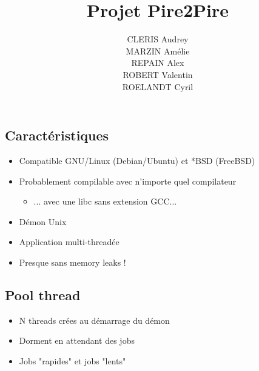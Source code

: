 \documentclass{beamer}
\begin{document}
\title{Projet Pire2Pire}
\author {
CLERIS Audrey        \\
MARZIN Amélie        \\
REPAIN Alex          \\
ROBERT Valentin      \\
ROELANDT Cyril
}


\begin{frame}
    \titlepage
\end{frame}

\begin{frame}
    \section{Caractéristiques}
    \begin{itemize}
        \item Compatible GNU/Linux (Debian/Ubuntu) et *BSD (FreeBSD)
        \item Probablement compilable avec n'importe quel compilateur
        \begin{itemize}
            \item ... avec une libc sans extension GCC...
        \end{itemize}
        \item Démon Unix
        \item Application multi-threadée
        \item Presque sans memory leaks !
    \end{itemize}
\end{frame}

\begin{frame}
    \section{Pool thread}
    \begin{itemize}
        \item N threads crées au démarrage du démon
        \item Dorment en attendant des jobs
        \item Jobs "rapides" et jobs "lents"
    \end{itemize}
\end{frame}
\end{document}
